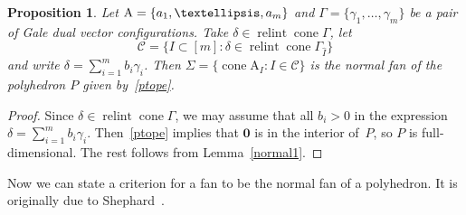 \documentclass[a4paper]{amsart}
\newtheorem{proposition}[theorem]{Proposition}
\theoremstyle{definition}
\theoremstyle{remark}
\newtheorem*{remark}{Remark}
\numberwithin{equation}{section}
\newcommand{\mb}[1]{{\textbf {\textit#1}}}
\def\cone{\mathop{\mathrm{cone}}}
\def\relint{\mathop{\mathrm{relint}}}
\newcommand{\<}{\langle}
\renewcommand{\>}{\rangle}
\begin{document}

\begin{proposition}\label{normal2}
Let $\mathrm A=\{\mb a_1,\ldots,\mb a_m\}$ and $\Gamma=\{\gamma_1,\ldots,\gamma_m\}$ be a pair of Gale dual vector configurations. Take
$\delta\in\relint\cone\Gamma$, let 
\[
  \mathcal C=\{I\subset[m]\colon\delta\in\relint\cone\Gamma_{\widehat I}\}
\]
and write $\delta=\sum_{i=1}^mb_i\gamma_i$. Then $\Sigma=\{\cone \mathrm A_I\colon I\in\mathcal C\}$ is the normal fan of the polyhedron $P$ given by~\eqref{ptope}.
\end{proposition}
\begin{proof}
Since $\delta\in\relint\cone\Gamma$, we may assume that all $b_i>0$ in the expression
$\delta=\sum_{i=1}^mb_i\gamma_i$. Then~\eqref{ptope} implies that $\mathbf 0$ is in the interior of~$P$, so $P$ is full-dimensional. The rest follows from Lemma~\ref{normal1}.
\end{proof}

Now we can state a criterion for a fan to be the normal fan of a polyhedron. It is originally due to Shephard~\cite{shep71}.
\end{document}
